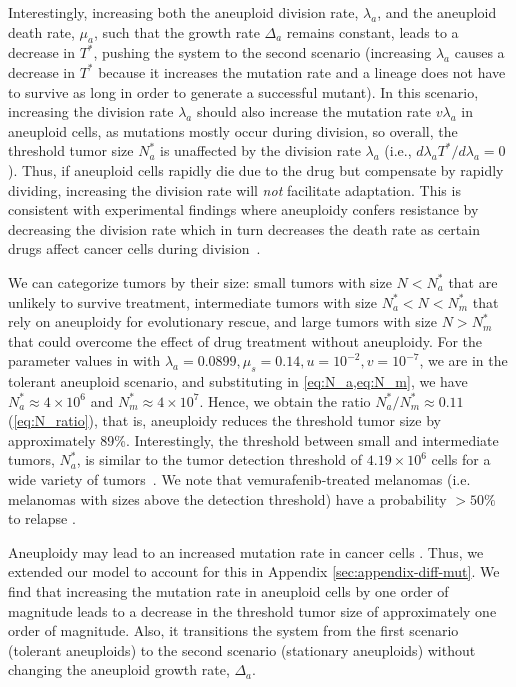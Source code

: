 \documentclass[12pt]{extarticle}
\begin{document}
Interestingly, increasing both the aneuploid division rate, $\lambda_a$, and the aneuploid death rate, $\mu_a$, such that the growth rate $\Delta_a$ remains constant, leads to a decrease in $T^*$, pushing the system to the second scenario (increasing $\lambda_a$ causes a decrease in $T^*$ because  it increases the mutation rate and a lineage does not have to survive as long in order to generate a successful mutant). In this scenario, increasing the division rate $\lambda_a$ should also increase the mutation rate $v\lambda_a$ in aneuploid cells, as mutations mostly occur during division, so overall, the threshold tumor size $N_a^*$ is unaffected by the division rate $\lambda_a$ (i.e., $d \lambda_a T^*/d\lambda_a = 0$). Thus, if aneuploid cells rapidly die due to the drug but compensate by rapidly dividing, increasing the division rate will \emph{not} facilitate adaptation. %
This is consistent with experimental findings where aneuploidy confers resistance by decreasing the division rate which in turn decreases the death rate as certain drugs affect cancer cells during division~\citep{replogle2020aneuploidy}. %

We can categorize tumors by their size: small tumors with size $N<N_a^*$ that are unlikely to survive treatment, intermediate tumors with size $N_a^* < N < N_m^*$ that rely on aneuploidy for evolutionary rescue, and large tumors with size $N > N_m^*$ that could overcome the effect of drug treatment without aneuploidy.
For the parameter values in  with $\lambda_a=0.0899,\mu_s=0.14, u=10^{-2}, v=10^{-7}$, we are in the tolerant aneuploid scenario, and substituting in \cref{eq:N_a,eq:N_m}, we have $N_a^* \approx 4 \times 10^6$ and $N_m^* \approx 4 \times 10^7$.
Hence, we obtain the ratio $N^*_a/N^*_m \approx 0.11$ (\cref{eq:N_ratio}), that is, aneuploidy reduces the threshold tumor size by approximately 89\%.
Interestingly, the threshold between small and intermediate tumors, $N_a^*$, is similar to the tumor detection threshold of $4.19 \times 10^6$ cells for a wide variety of tumors~\citep{avanzini2019cancer}. We note that vemurafenib-treated melanomas (i.e. melanomas with sizes above the detection threshold) have a probability $>50\%$ to relapse \citep{piejko2023long,handa2022long}. %

Aneuploidy may lead to an increased mutation rate in cancer cells \citep{garribba2023short,passerini2016presence,janssen2011chromosome}. Thus, we extended our model to account for this in Appendix \ref{sec:appendix-diff-mut}. We find that increasing the mutation rate in aneuploid cells by one order of magnitude leads to a decrease in the threshold tumor size of approximately one order of magnitude. Also, it transitions the system from the first scenario (tolerant aneuploids) to the second scenario (stationary aneuploids) without changing the aneuploid growth rate, $\Delta_a$. %
\end{document}
